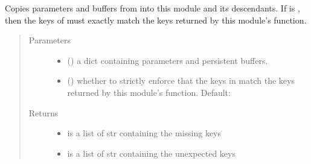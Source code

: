 \documentclass[letterpaper,10pt,english]{sphinxmanual}
\begin{document}
\begin{fulllineitems}
\begin{fulllineitems}
\label{\detokenize{api/autoencoding:geology.metamodelling.SpatialAutoencoder.load_state_dict}}
Copies parameters and buffers from {\hyperref[\detokenize{api/autoencoding:geology.metamodelling.SpatialAutoencoder.state_dict}]{}} into
this module and its descendants. If  is , then
the keys of {\hyperref[\detokenize{api/autoencoding:geology.metamodelling.SpatialAutoencoder.state_dict}]{}} must exactly match the keys returned
by this module’s  function.
\begin{quote}\begin{description}
\item[{Parameters}] \leavevmode\begin{itemize}
\item {} 
 () \textendash{} a dict containing parameters and
persistent buffers.

\item {} 
 (\sphinxstyleliteralemphasis{\sphinxupquote{, }}) \textendash{} whether to strictly enforce that the keys
in {\hyperref[\detokenize{api/autoencoding:geology.metamodelling.SpatialAutoencoder.state_dict}]{}} match the keys returned by this module’s
 function. Default: 

\end{itemize}

\item[{Returns}] \leavevmode
\begin{itemize}
\item {} 
 is a list of str containing the missing keys

\item {} 
 is a list of str containing the unexpected keys


\end{itemize}
\end{description}
\end{quote}
\end{fulllineitems}
\end{fulllineitems}
\end{document}
